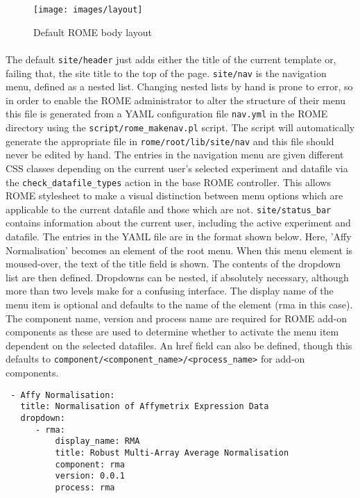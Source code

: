 \begin{figure}
\centering
\caption{Default ROME body layout}\label{fig:layout}
\texttt{[image: images/layout]}
\end{figure}

\paragraph{}
The default \texttt{site/header} just adds either the title of the current template or, failing that, the site title to the top of the page. \texttt{site/nav} is the navigation menu, defined as a nested list. Changing nested lists by hand is prone to error, so in order to enable the ROME administrator to alter the structure of their menu this file is generated from a YAML configuration file \texttt{nav.yml} in the ROME directory using the \texttt{script/rome\_makenav.pl} script. The script will automatically generate the appropriate file in \texttt{rome/root/lib/site/nav} and this file should never be edited by hand. The entries in the navigation menu are given different CSS classes depending on the current user's selected experiment and datafile via the \texttt{check\_datafile\_types} action in the base ROME controller. This allows ROME stylesheet to make a visual distinction between menu options which are applicable to the current datafile and those which are not. \texttt{site/status\_bar} contains information about the current user, including the active experiment and datafile. The entries in the YAML file are in the format shown below. Here, 'Affy Normalisation' becomes an element of the root menu. When this menu element is moused-over, the text of the title field is shown. The contents of the dropdown list are then defined. Dropdowns can be nested, if absolutely necessary, although more than two levels make for a confusing interface. The display name of the menu item is optional and defaults to the name of the element (rma in this case). The component name, version and process name are required for ROME add-on components as these are used to determine whether to activate the menu item dependent on the selected datafiles. An href field can also be defined, though this defaults to \texttt{component/<component\_name>/<process\_name>} for add-on components.

\begin{scriptsize}
\begin{verbatim}
 - Affy Normalisation:
   title: Normalisation of Affymetrix Expression Data 
   dropdown:
      - rma:
          display_name: RMA
          title: Robust Multi-Array Average Normalisation
          component: rma
          version: 0.0.1
          process: rma
\end{verbatim}
\end{scriptsize}

